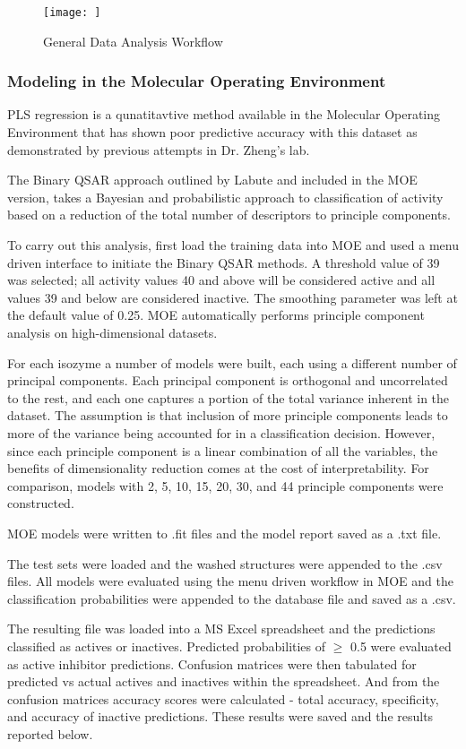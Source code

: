 \begin{figure}[h,t]
  \caption{General Data Analysis Workflow}
  \centering
   \texttt{[image: ]}
\end{figure}

\subsubsection{Modeling in the Molecular Operating Environment}
PLS regression is a qunatitavtive method available in the Molecular Operating Environment that has shown poor predictive accuracy with this dataset as demonstrated by previous attempts in Dr. Zheng's lab.

The Binary QSAR approach outlined by Labute \cite{Labute2001} and included in the MOE version, takes a Bayesian and probabilistic approach to classification of activity based on a reduction of the total number of descriptors to principle components.

To carry out this analysis, first load the training data into MOE and used a menu driven interface to initiate the Binary QSAR methods. A threshold value of 39 was selected; all activity values 40 and above will be considered active and all values 39 and below are considered inactive. The smoothing parameter was left at the default value of 0.25. MOE automatically performs principle component analysis on high-dimensional datasets.

For each isozyme a number of models were built, each using a different number of principal components.  Each principal component is orthogonal and uncorrelated to the rest, and each one captures a portion of the total variance inherent in the dataset. The assumption is that inclusion of more principle components leads to more of the variance being accounted for in a classification decision. However, since each principle component is a linear combination of all the variables, the benefits of dimensionality reduction comes at the cost of interpretability.  For comparison, models with 2, 5, 10, 15, 20, 30, and 44 principle components were constructed. 

MOE models were written to .fit files and the model report saved as a .txt file.

The test sets were loaded and the washed structures were appended to the .csv files. All models were evaluated using the menu driven workflow in MOE and the classification probabilities were appended to the database file and saved as a .csv.  

The resulting file was loaded into a MS Excel spreadsheet and the predictions classified as actives or inactives. Predicted probabilities of $\geq$ 0.5 were evaluated as active inhibitor predictions. Confusion matrices were then tabulated for predicted vs actual actives and inactives within the spreadsheet. And from the confusion matrices accuracy scores were calculated - total accuracy, specificity, and accuracy of inactive predictions. These results were saved and the results reported below.

